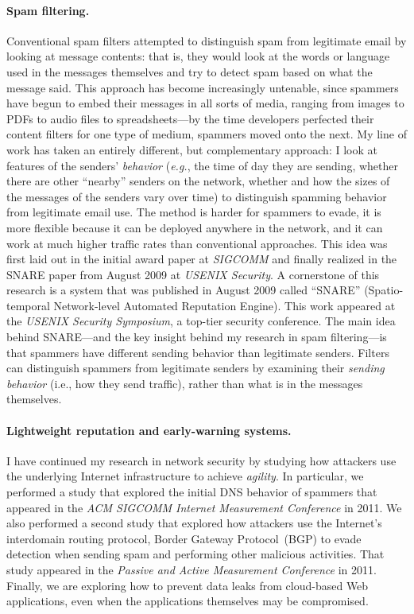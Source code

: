 \documentclass{article}
\newcommand{\eg}{{\em e.g.}}
\begin{document}
\paragraph{Spam filtering.}
Conventional spam filters attempted to distinguish spam from legitimate
email by looking at message contents: that is, they would look at the
words or language used in the messages themselves and try to detect spam
based on what the message said.  This approach has become increasingly
untenable, since spammers have begun to embed their messages in all
sorts of media, ranging from images to PDFs to audio files to
spreadsheets---by the time developers perfected their content filters
for one type of medium, spammers moved onto the next.  My line of work
has taken an entirely different, but complementary approach: I look at
features of the senders' {\em behavior} (\eg, the time of day they are
sending, whether there are other ``nearby'' senders on the network,
whether and how the sizes of the messages of the senders vary over time)
to distinguish spamming behavior from legitimate email use.  The method
is harder for spammers to evade, it is more flexible because it can be
deployed anywhere in the network, and it can work at much higher traffic
rates than conventional approaches.  This idea was first laid out in the
initial award paper at {\em SIGCOMM} and finally realized in the SNARE
paper from August 2009 at {\em USENIX Security}.  A cornerstone of this
research is a system that was published in August 2009 called ``SNARE''
(Spatio-temporal Network-level Automated Reputation Engine). This work
appeared at the {\em USENIX Security Symposium}, a top-tier security
conference. The main idea behind SNARE---and the key insight behind my
research in spam filtering---is that spammers have different sending
behavior than legitimate senders.  Filters can distinguish spammers from
legitimate senders by examining their {\em sending behavior} (i.e., how
they send traffic), rather than what is in the messages themselves.

\paragraph{Lightweight reputation and early-warning systems.}
I have continued my research in network security by studying how
attackers use the underlying Internet infrastructure to achieve {\em
agility}.  In particular, we performed a study that explored the initial
DNS behavior of spammers that appeared in the {\em ACM SIGCOMM Internet
Measurement Conference} in 2011. We also performed a second study that
explored how attackers use the Internet's interdomain routing protocol,
Border Gateway Protocol~(BGP) to evade detection when sending spam and
performing other malicious activities.  That study appeared in the {\em
Passive and Active Measurement Conference} in 2011.  Finally, we are
exploring how to prevent data leaks from cloud-based Web applications,
even when the applications themselves may be compromised.  
\end{document}
